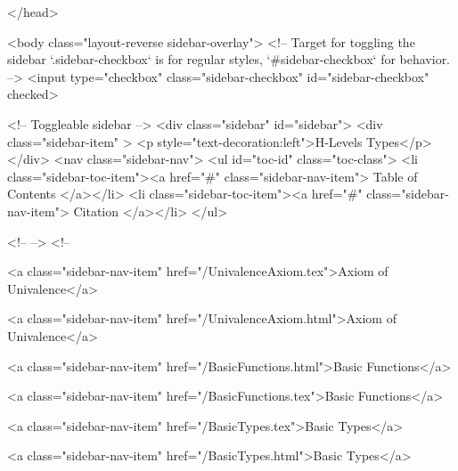   
</head>




  <body class="layout-reverse sidebar-overlay">
    <!-- Target for toggling the sidebar `.sidebar-checkbox` is for regular
     styles, `#sidebar-checkbox` for behavior. -->
<input type="checkbox" class="sidebar-checkbox" id="sidebar-checkbox" checked>

<!-- Toggleable sidebar -->
<div class="sidebar" id="sidebar">
  <div class="sidebar-item" >
    <p style="text-decoration:left">H-Levels Types</p>
  </div>
  <nav class="sidebar-nav">
    <ul id="toc-id" class="toc-class">
  <li class="sidebar-toc-item"><a href="#" class="sidebar-nav-item"> Table of Contents </a></li>
  <li class="sidebar-toc-item"><a href="#" class="sidebar-nav-item"> Citation </a></li>
</ul>


    <!--  -->
    <!-- 
      
    
      
    
      
    
      
    
      
        
      
    
      
        
          <a class="sidebar-nav-item" href="/UnivalenceAxiom.tex">Axiom of Univalence</a>
        
      
    
      
        
          <a class="sidebar-nav-item" href="/UnivalenceAxiom.html">Axiom of Univalence</a>
        
      
    
      
        
          <a class="sidebar-nav-item" href="/BasicFunctions.html">Basic Functions</a>
        
      
    
      
        
          <a class="sidebar-nav-item" href="/BasicFunctions.tex">Basic Functions</a>
        
      
    
      
        
          <a class="sidebar-nav-item" href="/BasicTypes.tex">Basic Types</a>
        
      
    
      
        
          <a class="sidebar-nav-item" href="/BasicTypes.html">Basic Types</a>
        
      
    
